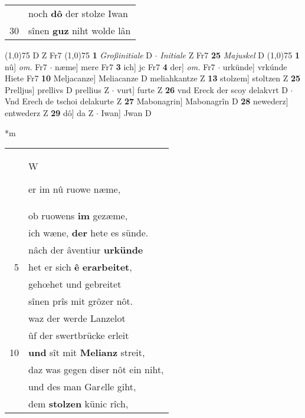 \documentclass[8pt,a4paper,notitlepage]{article}
\begin{document}
\begin{table}[ht]
\begin{minipage}[t]{0.5\linewidth}
\begin{tabular}{rl}
 & noch \textbf{dô} der stolze Iwan\\ 
30 & sînen \textbf{guz} niht wolde lân\\ 
\end{tabular}
\scriptsize
\line(1,0){75} \newline
D Z Fr7 \newline
\line(1,0){75} \newline
\textbf{1} \textit{Großinitiale} D   $\cdot$ \textit{Initiale} Z Fr7  \textbf{25} \textit{Majuskel} D  \newline
\line(1,0){75} \newline
\textbf{1} nû] \textit{om.} Fr7  $\cdot$ næme] mere Fr7 \textbf{3} ich] jc Fr7 \textbf{4} der] \textit{om.} Fr7  $\cdot$ urkünde] vrkúnde Hiete Fr7 \textbf{10} Meljacanze] Meliacanze D meliahkantze Z \textbf{13} stolzem] stoltzen Z \textbf{25} Prelljus] prellivs D prellius Z  $\cdot$ vurt] furte Z \textbf{26} vnd Ereck der scoy delakvrt D  $\cdot$ Vnd Erech de tschoi delakurte Z \textbf{27} Mabonagrin] Mabonagrîn D \textbf{28} newederz] entwederz Z \textbf{29} dô] da Z  $\cdot$ Iwan] Jwan D \newline
\end{minipage}
\hspace{0.5cm}
\begin{minipage}[t]{0.5\linewidth}
\small
\begin{center}*m
\end{center}
\begin{tabular}{rl}
 & \begin{large}W\end{large}er im nû ruowe næme,\\ 
 & ob ruowens \textbf{im} gezæme,\\ 
 & ich wæne, \textbf{der} hete es sünde.\\ 
 & nâch der âventiur \textbf{urkünde}\\ 
5 & het er sich \textbf{ê} \textbf{erarbeitet},\\ 
 & gehœhet und gebreitet\\ 
 & sînen prîs mit grôzer nôt.\\ 
 & waz der werde Lanzelot\\ 
 & ûf der swertbrücke erleit\\ 
10 & \textbf{und} sît mit \textbf{Melianz} streit,\\ 
 & daz was gegen diser nôt ein niht,\\ 
 & und des man Gar\textit{e}lle giht,\\ 
 & dem \textbf{stolzen} künic rîch,\\ 

\end{tabular}
\end{minipage}
\end{table}
\end{document}
